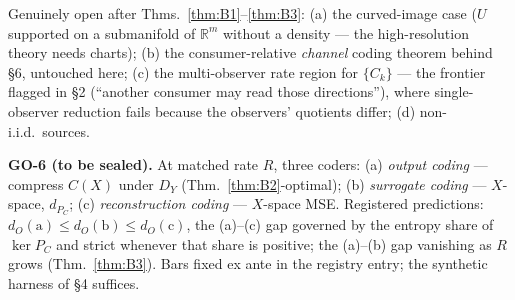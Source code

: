 Genuinely open after Thms.~\ref{thm:B1}--\ref{thm:B3}: (a) the curved-image
case ($U$ supported on a submanifold of $\mathbb{R}^m$ without a density ---
the high-resolution theory needs charts); (b) the consumer-relative
\emph{channel} coding theorem behind \S6, untouched here; (c) the
multi-observer rate region for $\{C_k\}$ --- the frontier flagged in \S2
(``another consumer may read those directions''), where single-observer
reduction fails because the observers' quotients differ; (d) non-i.i.d.\
sources.

\smallskip\noindent\textbf{GO-6 (to be sealed).} At matched rate $R$, three
coders: (a) \emph{output coding} --- compress $C(X)$ under $D_Y$
(Thm.~\ref{thm:B2}-optimal); (b) \emph{surrogate coding} --- $X$-space,
$d_{P_C}$; (c) \emph{reconstruction coding} --- $X$-space MSE. Registered
predictions: $d_O(\mathrm a)\le d_O(\mathrm b)\le d_O(\mathrm c)$, the
(a)--(c) gap governed by the entropy share of $\ker P_C$ and strict whenever
that share is positive; the (a)--(b) gap vanishing as $R$ grows
(Thm.~\ref{thm:B3}). Bars fixed ex ante in the registry entry; the synthetic
harness of \S4 suffices.

